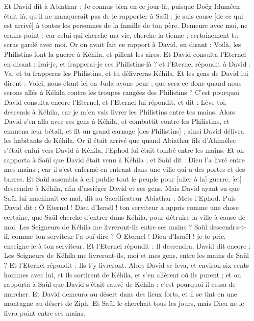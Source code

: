\begin{multicols}{2}
Et David dit à Abiathar : Je connus bien en ce jour-là, puisque Doëg Iduméen était là, qu'il ne manquerait pas de le rapporter à Saül ; je suis cause [de ce qui est arrivé] à toutes les personnes de la famille de ton père.
Demeure avec moi, ne crains point ; car celui qui cherche ma vie, cherche la tienne ; certainement tu seras gardé avec moi.
\VerseOne{}Or on avait fait ce rapport à David, en disant : Voilà, les Philistins font la guerre à Kéhila, et pillent les aires.
Et David consulta l'Eternel en disant : Irai-je, et frapperai-je ces Philistins-là ? et l'Eternel répondit à David : Va, et tu frapperas les Philistins, et tu délivreras Kéhila.
Et les gens de David lui dirent : Voici, nous étant ici en Juda avons peur ; que sera-ce donc quand nous serons allés à Kéhila contre les troupes rangées des Philistins ?
C'est pourquoi David consulta encore l'Eternel, et l'Eternel lui répondit, et dit : Lève-toi, descends à Kéhila, car je m'en vais livrer les Philistins entre tes mains.
Alors David s'en alla avec ses gens à Kéhila, et combattit contre les Philistins, et emmena leur bétail, et fit un grand carnage [des Philistins] ; ainsi David délivra les habitants de Kéhila.
Or il était arrivé que quand Abiathar fils d'Ahimélec s'était enfui vers David à Kéhila, l'Ephod lui était tombé entre les mains.
Et on rapporta à Saül que David était venu à Kéhila ; et Saül dit : Dieu l'a livré entre mes mains ; car il s'est enfermé en entrant dans une ville qui a des portes et des barres.
Et Saül assembla à cri public tout le peuple pour [aller à la] guerre, [et] descendre à Kéhila, afin d'assiéger David et ses gens.
Mais David ayant su que Saül lui machinait ce mal, dit au Sacrificateur Abiathar : Mets l'Ephod.
Puis David dit : Ô Eternel ! Dieu d'Israël ! ton serviteur a appris comme une chose certaine, que Saül cherche d'entrer dans Kéhila, pour détruire la ville à cause de moi.
Les Seigneurs de Kéhila me livreront-ils entre ses mains ? Saül descendra-t-il, comme ton serviteur l'a ouï dire ? Ô Eternel ! Dieu d'Israël ! je te prie, enseigne-le à ton serviteur. Et l'Eternel répondit : Il descendra.
David dit encore : Les Seigneurs de Kéhila me livreront-ils, moi et mes gens, entre les mains de Saül ? Et l'Eternel répondit : Ils t'y livreront.
Alors David se leva, et environ six cents hommes avec lui, et ils sortirent de Kéhila, et s'en allèrent où ils purent ; et on rapporta à Saül que David s'était sauvé de Kéhila : c'est pourquoi il cessa de marcher.
Et David demeura au désert dans des lieux forts, et il se tint en une montagne au désert de Ziph. Et Saül le cherchait tous les jours, mais Dieu ne le livra point entre ses mains.

\end{multicols}
